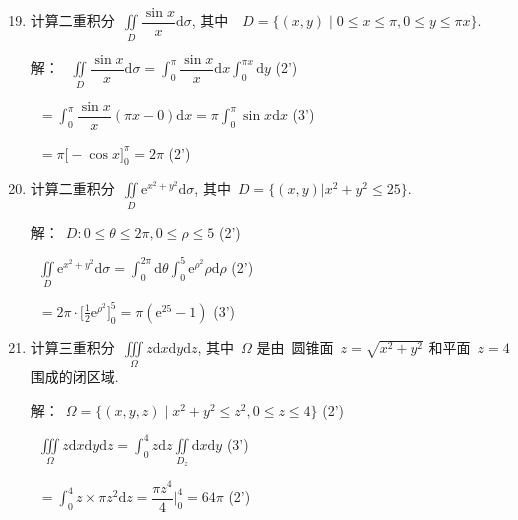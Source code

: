 \documentclass[twocolumn,landscape,UTF8]{ctexart}
\newcommand{\putzdx}{\marginpar{
		\parbox{1cm}{\vspace{-1.6cm}
			\rotatebox[origin=c]{90}{
				\usebox{\zdx}
		}}
}}
\newcommand{\me}{\mathrm{e}}  %
\newcommand{\dif}{\mathrm{d}}
\newcommand{\ds}{\displaystyle}
\begin{document}
\begin{spacing}{1.3}
		\begin{enumerate}\setcounter{enumi}{18}
			\item 计算二重积分~$\ds{\iint\limits_{D}\dfrac{\sin x}{x}\dif \sigma}$, 其中~~$D=\{(x,y)\mid 0\leqslant x \leqslant \pi, 0\leqslant y \leqslant \pi x\}$.
			
			解：
			~$\ds{\iint\limits_{D}\dfrac{\sin x}{x}\dif \sigma}= \ds{\int_0^\pi\dfrac{\sin x}{x}\dif x\int_{0}^{\pi x}\dif y}$  \dotfill{}(2')
			
			~$= \ds{\int_0^\pi\dfrac{\sin x}{x}(\pi x- 0)\dif x = \pi\int_0^\pi\sin x\dif x  }$  \dotfill{}(3')
			
			~$=  \pi\Big[-\cos x \Big]_0^\pi = 2\pi $  \dotfill{}(2')
			
			\item 计算二重积分~$\ds{\iint\limits_{D}\me^{x^2+y^2}\dif \sigma}$, 其中~$D=\{(x,y)\Big| x^2+ y^2 \leqslant 25\}$.

			解：~$D: 0\leqslant \theta \leqslant 2\pi, 0\leqslant \rho \leqslant 5$  \dotfill{}(2')
			
			~$\ds{\iint\limits_{D}\me^{x^2+y^2}\dif \sigma}= \ds{\int_0^{2\pi}\dif \theta\int_0^5\me^{\rho^2}\rho\dif \rho}$  \dotfill{}(2')
			
			~$= \ds{2\pi \cdot\Big[\frac{1}{2}\me^{\rho^2}\Big]_0^5 = \pi(\me^{25}-1)} $  \dotfill{}(3')
			
			\vspace{1cm}
			\item 计算三重积分~$\ds{\iiint\limits_{\Omega}z \dif x\dif y\dif z}$, 其中~$\Omega$ 是由~圆锥面~$z = \sqrt{x^2+ y^2}$ 和平面~$z=4$ 围成的闭区域.
			
			解：~$\Omega = \{(x,y,z)\mid x^2 + y^2 \leqslant z^2,0\leqslant z\leqslant 4\}$ \dotfill{}(2')
			
			~$ \ds{\iiint\limits_{\Omega}z \dif x\dif y\dif z =  \int_0^4 z \dif z \iint\limits_{D_z}\dif x\dif y}$ \dotfill{}(3')
			
			~$  = \ds{\int_0^4z\times \pi z^2\dif z= \dfrac{\pi z^4}{4}\Big|_0^4=64\pi}$ \dotfill{}(2')
		\end{enumerate}
		\newpage
		\putzdx %

\end{spacing}
\end{document}
